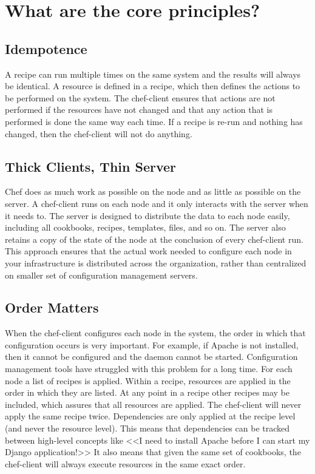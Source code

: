 \section{What are the core principles?}
\label{sec:what-principles}

\subsection{Idempotence}

A recipe can run multiple times on the same system and the results will always be identical. A resource is defined in a recipe, which then defines the actions to be performed on the system. The chef-client ensures that actions are not performed if the resources have not changed and that any action that is performed is done the same way each time. If a recipe is re-run and nothing has changed, then the chef-client will not do anything.

\subsection{Thick Clients, Thin Server}

Chef does as much work as possible on the node and as little as possible on the server. A chef-client runs on each node and it only interacts with the server when it needs to. The server is designed to distribute the data to each node easily, including all cookbooks, recipes, templates, files, and so on. The server also retains a copy of the state of the node at the conclusion of every chef-client run. This approach ensures that the actual work needed to configure each node in your infrastructure is distributed across the organization, rather than centralized on smaller set of configuration management servers.

\subsection{Order Matters}

When the chef-client configures each node in the system, the order in which that configuration occurs is very important. For example, if Apache is not installed, then it cannot be configured and the daemon cannot be started. Configuration management tools have struggled with this problem for a long time. For each node a list of recipes is applied. Within a recipe, resources are applied in the order in which they are listed. At any point in a recipe other recipes may be included, which assures that all resources are applied. The chef-client will never apply the same recipe twice. Dependencies are only applied at the recipe level (and never the resource level). This means that dependencies can be tracked between high-level concepts like <<I need to install Apache before I can start my Django application!>> It also means that given the same set of cookbooks, the chef-client will always execute resources in the same exact order.

